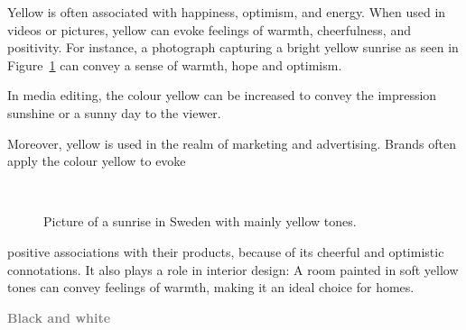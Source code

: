 \documentclass[../MasterThesis.tex]{subfiles}
\begin{document}
%
%
\begin{minipage}{0.45\textwidth}
	Yellow is often associated with happiness, optimism, and energy. When used in videos or pictures, yellow can evoke feelings of warmth, cheerfulness, and positivity. For instance, a photograph capturing a bright yellow sunrise as seen in Figure~\ref{figure:yellow} can convey a sense of warmth, hope and optimism.
	
	In media editing, the colour yellow can be increased to convey the impression sunshine or a sunny day to the viewer.
	
	Moreover, yellow is used in the realm of marketing and advertising. Brands often apply the colour yellow to evoke 
	
	
\end{minipage}\begin{minipage}{0.05\textwidth}
	\ 
\end{minipage}\begin{minipage}{0.5\textwidth}
	\begin{figure}[H]
		\begin{center}
			\caption[Picture of a sunrise in Sweden with mainly yellow tones.]{Picture of a sunrise in Sweden with mainly yellow tones.}
			\label{figure:yellow}
		\end{center}
	\end{figure}\hfill
\end{minipage}

\vspace*{-0.6em}
positive associations with their products, because of its cheerful and optimistic connotations. It also plays a role in interior design: A room painted in soft yellow tones can convey feelings of warmth, making it an ideal choice for homes.~\cite{colour2}





\textbf{\textcolor{gray}{Black and white}}
\end{document}
